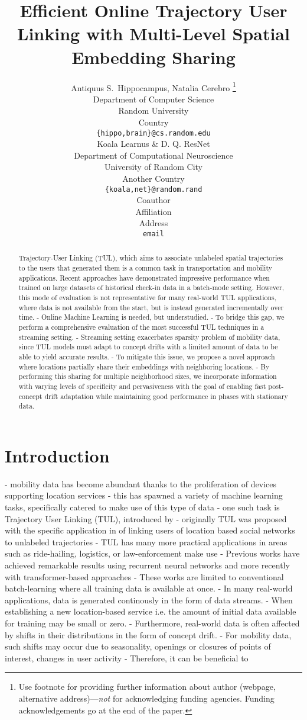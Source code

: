\documentclass{article} %
\title{Efficient Online Trajectory User Linking with Multi-Level Spatial Embedding Sharing}
\author{Antiquus S.~Hippocampus, Natalia Cerebro  \thanks{ Use footnote for providing further information
about author (webpage, alternative address)---\emph{not} for acknowledging
funding agencies.  Funding acknowledgements go at the end of the paper.} \\
Department of Computer Science\\
Random University\\
Country \\
\texttt{\{hippo,brain\}@cs.random.edu} \\
\And %
Koala Learnus \& D. Q. ResNet  \\
Department of Computational Neuroscience \\
University of Random City \\
Another Country \\
\texttt{\{koala,net\}@random.rand} \\
\AND %
Coauthor \\
Affiliation \\
Address \\
\texttt{email}
}
\begin{document}
\maketitle

\begin{abstract}
   Trajectory-User Linking (TUL), which aims to associate unlabeled spatial trajectories to the users that generated them is a common task in transportation and mobility applications. Recent approaches have demonstrated impressive performance when trained on large datasets of historical check-in data in a batch-mode setting. However, this mode of evaluation is not representative for many real-world TUL applications, where data is not available from the start, but is instead generated incrementally over time. 
   - Online Machine Learning is needed, but understudied. 
   - To bridge this gap, we perform a comprehensive evaluation of the most successful TUL techniques in a streaming setting.
   - Streaming setting exacerbates sparsity problem of mobility data, since TUL models must adapt to concept drifts with a limited amount of data to be able to yield accurate results.
   - To mitigate this issue, we propose a novel approach where locations partially share their embeddings with neighboring locations. 
   - By performing this sharing for multiple neighborhood sizes, we incorporate information with varying levels of specificity and pervasiveness with the goal of enabling fast post-concept drift adaptation while maintaining good performance in phases with stationary data.
\end{abstract}

\section{Introduction}

- mobility data has become abundant thanks to the proliferation of devices supporting location services 
- this has spawned a variety of machine learning tasks, specifically catered to make use of this type of data
- one such task is Trajectory User Linking (TUL), introduced by \citet{gaoIdentifyingHumanMobility2017}
- originally TUL was proposed with the specific application in  of linking users of location based social networks to unlabeled trajectories \cite{gaoIdentifyingHumanMobility2017}  
- TUL has many more practical applications in areas such as ride-hailing, logistics, or law-enforcement make use 
- Previous works have achieved remarkable results using recurrent neural networks and more recently with transformer-based approaches 
- These works are limited to conventional batch-learning where all training data is available at once. 
- In many real-world applications, data is generated continously in the form of data streams. 
- When establishing a new location-based service i.e. the amount of initial data available for training may be small or zero. 
- Furthermore, real-world data is often affected by shifts in their distributions in the form of concept drift. 
- For mobility data, such shifts may occur due to seasonality, openings or closures of points of interest, changes in user activity 
- Therefore, it can be beneficial to 
\end{document}
